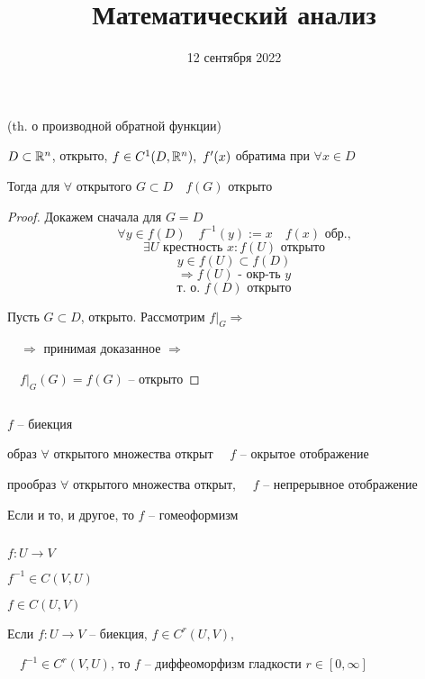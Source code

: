 


    \title{Математический анализ}
    \date{12 сентября 2022}
    \maketitle{}

    \pagebreak

    \begin{corollary}
        (th. о производной обратной функции)
        \par $D \subset \mathbb{R}^n$,  открыто, $f \in C^1(D, \mathbb{R}^n), \ f'(x)$ обратима при $\forall x \in D$
        \par Тогда для $\forall$ открытого $G \subset D \quad f(G)$ открыто
    \end{corollary}
    \begin{proof}
        Докажем сначала для $G = D$
        \[ \forall y \in f(D) \quad f^{-1}(y) := x \quad f(x) \text{ обр.,} \]
        \[ \exists U \text{ крестность } x : f(U) \text{ открыто} \]
        \[ y \in f(U) \subset f(D) \]
        \[ \Rightarrow f(U) \text{ - окр-ть } y \]
        \[\text{т. о. } f(D) \text{ открыто}\]
        \par Пусть $G \subset D$, открыто. Рассмотрим $f\big|_G \Rightarrow$
        \par $\quad \Rightarrow$ принимая доказанное $\Rightarrow$
        \par $\quad f\big|_G(G) = f(G)$ -- открыто
    \end{proof}

    $ $
    \linebreak
    \par $f$ -- биекция
    \par образ $\forall$ открытого множества открыт $\quad f$ -- окрытое отображение
    \par прообраз $\forall$ открытого множества открыт, $\quad f$ -- непрерывное отображение

    \begin{definition}
        Если и то, и другое, то $f$ -- гомеоформизм
    \end{definition}

    $ $
    \par $f : U \rightarrow V$
    \par $f^{-1} \in C(V, U)$
    \par $f \in C(U, V)$

    \begin{definition}
        Если $f : U \rightarrow V$ -- биекция, $f \in C^r(U, V)$,
        \par $\quad f^{-1} \in C^r(V, U)$, то $f$ -- диффеоморфизм гладкости $r \in [0, \infty]$
    \end{definition}

